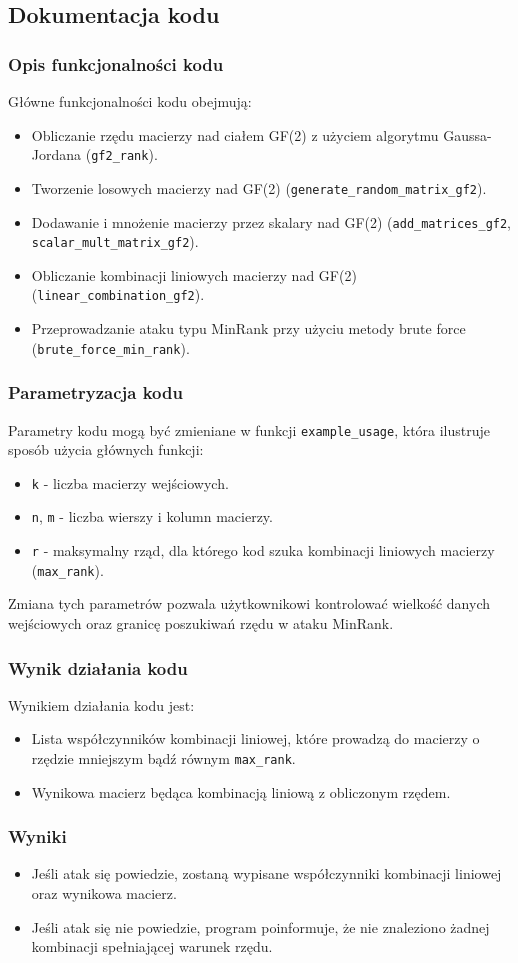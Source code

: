 
\subsection{Dokumentacja kodu}
\subsubsection{Opis funkcjonalności kodu}
Główne funkcjonalności kodu obejmują:
\begin{itemize}
    \item Obliczanie rzędu macierzy nad ciałem GF(2) z użyciem algorytmu Gaussa-Jordana (\texttt{gf2\_rank}).
    \item Tworzenie losowych macierzy nad GF(2) (\texttt{generate\_random\_matrix\_gf2}).
    \item Dodawanie i mnożenie macierzy przez skalary nad GF(2) (\texttt{add\_matrices\_gf2}, \texttt{scalar\_mult\_matrix\_gf2}).
    \item Obliczanie kombinacji liniowych macierzy nad GF(2) (\texttt{linear\_combination\_gf2}).
    \item Przeprowadzanie ataku typu MinRank przy użyciu metody brute force (\texttt{brute\_force\_min\_rank}).
\end{itemize}

\subsubsection{Parametryzacja kodu}
Parametry kodu mogą być zmieniane w funkcji \texttt{example\_usage}, która ilustruje sposób użycia głównych funkcji:
\begin{itemize}
    \item \texttt{k} - liczba macierzy wejściowych.
    \item \texttt{n}, \texttt{m} - liczba wierszy i kolumn macierzy.
    \item \texttt{r} - maksymalny rząd, dla którego kod szuka kombinacji liniowych macierzy (\texttt{max\_rank}).
\end{itemize}

Zmiana tych parametrów pozwala użytkownikowi kontrolować wielkość danych wejściowych oraz granicę poszukiwań rzędu w ataku MinRank.

\subsubsection{Wynik działania kodu}
Wynikiem działania kodu jest:
\begin{itemize}
    \item Lista współczynników kombinacji liniowej, które prowadzą do macierzy o rzędzie mniejszym bądź równym \texttt{max\_rank}.
    \item Wynikowa macierz będąca kombinacją liniową z obliczonym rzędem.
\end{itemize}

\subsubsection{Wyniki}
\begin{itemize}
    \item Jeśli atak się powiedzie, zostaną wypisane współczynniki kombinacji liniowej oraz wynikowa macierz.
    \item Jeśli atak się nie powiedzie, program poinformuje, że nie znaleziono żadnej kombinacji spełniającej warunek rzędu.
\end{itemize}

